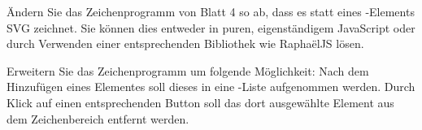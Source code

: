 %
\par Ändern Sie das Zeichenprogramm von Blatt 4 so ab, dass es statt eines -Elements SVG zeichnet. Sie können dies entweder in puren, eigenständigem JavaScript oder durch Verwenden einer entsprechenden Bibliothek wie RaphaëlJS lösen.
%
\par Erweitern Sie das Zeichenprogramm um folgende Möglichkeit: Nach dem Hinzufügen eines Elementes soll dieses in eine -Liste aufgenommen werden. Durch Klick auf einen entsprechenden Button soll das dort ausgewählte Element aus dem Zeichenbereich entfernt werden.